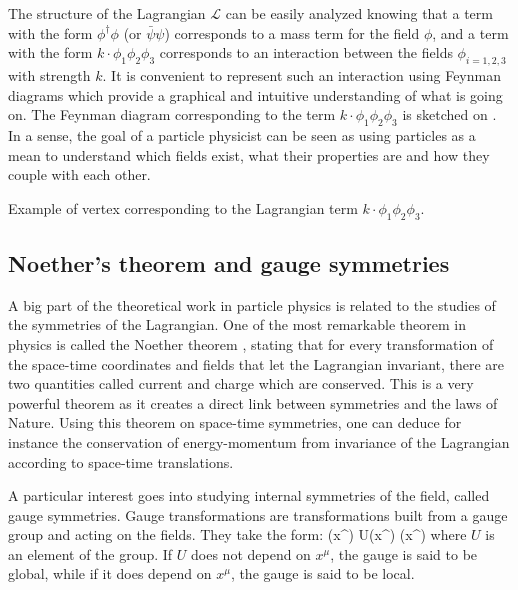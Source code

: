     The structure of the Lagrangian $\mathcal{L}$ can be easily analyzed knowing that
    a term with the form $\phi^\dagger \phi$ (or $\bar{\psi}\psi$) corresponds to a mass term for the field $\phi$,
    and a term with the form $k \cdot \phi_1 \phi_2 \phi_3$ corresponds to an interaction
    between the fields $\phi_{i=1,2,3}$ with strength $k$. It is convenient to
    represent such an interaction using Feynman diagrams which provide a graphical and
    intuitive understanding of what is going on. The Feynman diagram corresponding to the
    term  $k \cdot \phi_1 \phi_2 \phi_3$ is sketched on .
    In a sense, the goal of a particle physicist can be seen as using particles as a mean
    to understand which fields exist, what their properties are and how they couple with
    each other.

                 {Example of vertex corresponding to the Lagrangian term
                 $k \cdot \phi_1 \phi_2 \phi_3$.}

        \subsection{Noether's theorem and gauge symmetries}

    A big part of the theoretical work in particle physics is related to the studies of
    the symmetries of the Lagrangian. One of the most remarkable theorem in physics is
    called the Noether theorem \cite{Noether}, stating that for every transformation of the space-time
    coordinates and fields that let the Lagrangian invariant, there are two quantities
    called current and charge which are conserved. This is a very powerful theorem as it
    creates a direct link between symmetries and the laws of Nature. Using this theorem on
    space-time symmetries, one can deduce for instance the conservation of energy-momentum
    from invariance of the Lagrangian according to space-time translations.

    A particular interest goes into studying internal symmetries of the field,
    called gauge symmetries. Gauge transformations are transformations built from a gauge
    group and acting on the fields. They take the form:
    {
        \psi(x^\mu)
        \rightarrow
        U(x^\mu) \psi(x^\mu)
    }
    where $U$ is an element of the group. If $U$ does not depend on $x^\mu$, the gauge is
    said to be global, while if it does depend on $x^\mu$, the gauge is said to be local.

